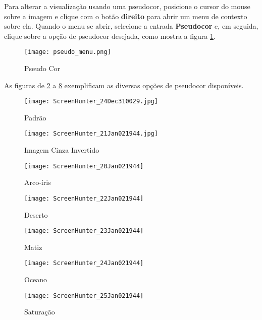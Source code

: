 Para alterar a visualização usando uma pseudocor, posicione o cursor do mouse sobre a imagem e clique
com o botão \textbf{direito} para abrir um menu de contexto sobre ela. Quando o menu se abrir,
selecione a entrada \textbf{Pseudocor} e, em seguida, clique sobre a opção de pseudocor desejada, como
mostra a figura \ref{fig:pseudo_color}.

\begin{figure}[!htb]
\centering
\texttt{[image: pseudo\_menu.png]}
\caption{Pseudo Cor}
\label{fig:pseudo_color}
\end{figure}

As figuras de \ref{fig:image_default} a \ref{fig:image_saturation} exemplificam as diversas opções de
pseudocor disponíveis.\\

\begin{figure}[!htb]
\centering
\texttt{[image: ScreenHunter\_24Dec310029.jpg]}
\caption{Padrão}
\label{fig:image_default}
\end{figure}

\begin{figure}[!htb]
\centering
\texttt{[image: ScreenHunter\_21Jan021944.jpg]}
\caption{Imagem Cinza Invertido}
\label{fig:image_inverted}
\end{figure}

\begin{figure}[!htb]
\centering
\texttt{[image: ScreenHunter\_20Jan021944]}
\caption{Arco-íris}
\label{fig:image_arc}
\end{figure}

\begin{figure}[!htb]
\centering
\texttt{[image: ScreenHunter\_22Jan021944]}
\caption{Deserto}
\label{fig:image_desert}
\end{figure}

\begin{figure}[!htb]
\centering
\texttt{[image: ScreenHunter\_23Jan021944]}
\caption{Matiz}
\label{fig:image_matiz}
\end{figure}

\begin{figure}[!htb]
\centering
\texttt{[image: ScreenHunter\_24Jan021944]}
\caption{Oceano}
\label{fig:image_ocean}
\end{figure}

\begin{figure}[!htb]
\centering
\texttt{[image: ScreenHunter\_25Jan021944]}
\caption{Saturação}
\label{fig:image_saturation}
\end{figure}

